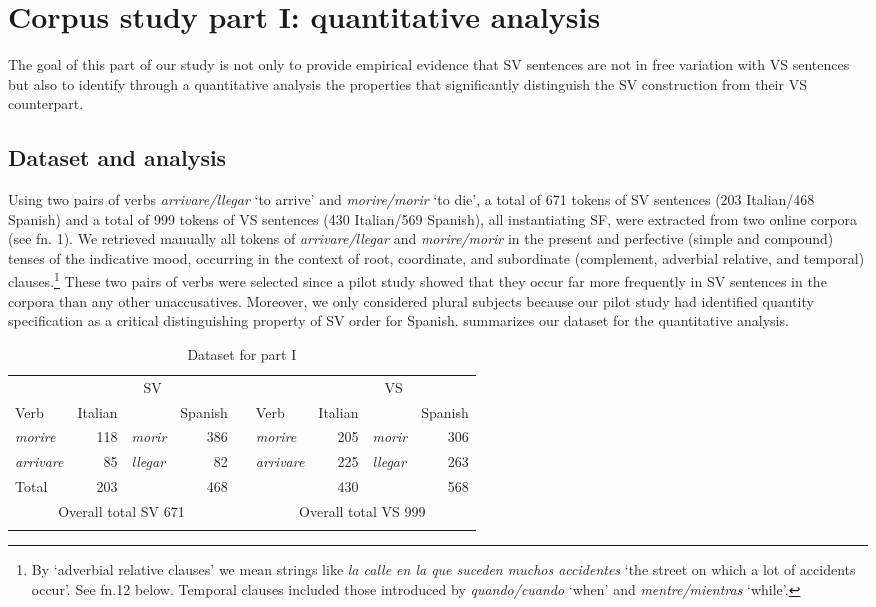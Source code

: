 \documentclass[output=paper,colorlinks,citecolor=brown,
]{langscibook}
\begin{document}
\section{Corpus study part I: quantitative analysis}\label{sec:nishida:3}

The goal of this part of our study is not only to provide empirical evidence that SV sentences are not in free variation with VS sentences but also to identify through a quantitative analysis the properties that significantly distinguish the SV construction from their VS counterpart. 

\subsection{Dataset and analysis}

Using two pairs of verbs \textit{arrivare/llegar} `to arrive' and \textit{morire/morir} `to die', a total of 671 tokens of SV sentences (203 Italian/468 Spanish) and a total of 999 tokens of VS sentences (430 Italian/569 Spanish), all instantiating SF, were extracted from two online corpora (see fn. 1). We retrieved manually all tokens of \textit{arrivare/llegar} and \textit{morire/morir} in the present and perfective (simple and compound) tenses of the indicative mood, occurring in the context of root, coordinate, and subordinate (complement, adverbial relative, and temporal) clauses.\footnote{By `adverbial relative clauses' we mean strings like \textit{la calle en la que suceden muchos accidentes} `the street on which a lot of accidents occur'. See fn.12 below. Temporal clauses included those introduced by \textit{quando/cuando} `when' and \textit{mentre/mientras} `while'.} These two pairs of verbs were selected since a pilot study showed that they occur far more frequently in SV sentences in the corpora than any other unaccusatives. Moreover, we only considered plural subjects because our pilot study had identified quantity specification as a critical distinguishing property of SV order for Spanish.  summarizes our dataset for the quantitative analysis.

\newpage
\begin{table}
    \begin{tabularx}{\textwidth}{lrlrllrlr}
    \lsptoprule
         &  \multicolumn{3}{c}{SV} & & &  \multicolumn{3}{c}{VS}\\ 
        Verb & Italian & & Spanish && Verb & Italian & & Spanish \\ \midrule 
\textit{morire} & 118 & \textit{morir} & 386 && \textit{morire} & 205 & \textit{morir} & 306 \\
\textit{arrivare} & 85 & \textit{llegar} & 82 && \textit{arrivare} & 225 & \textit{llegar} & 263 \\
Total & 203 & & 468 & & & 430 & & 568 \\ 
\multicolumn{4}{c}{Overall total SV 671} && \multicolumn{4}{c}{Overall total VS 999} \\
    \lspbottomrule
    \end{tabularx}
    \caption{Dataset for part I}
    \label{tab:nishida:1}
\end{table}
\end{document}
